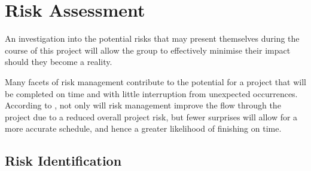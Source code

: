 \section{Risk Assessment}

An investigation into the potential risks that may present themselves during the
course of this project will allow the group to effectively minimise their impact
should they become a reality. 

Many facets of risk management contribute to the potential for a project that
will be completed on time and with little interruption from unexpected
occurrences. According to \citet{mcmanus03}, not only will risk management
improve the flow through the project due to a reduced overall project risk, but
fewer surprises will allow for a more accurate schedule, and hence a greater
likelihood of finishing on time.


\subsection{Risk Identification}

